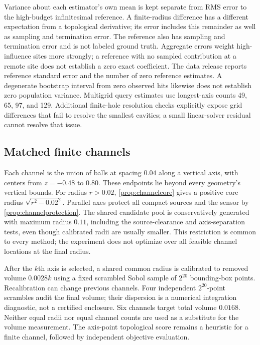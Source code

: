 Variance about each estimator's own mean is kept separate from RMS error to
the high-budget infinitesimal reference. A finite-radius difference has a
different expectation from a topological derivative; its error includes this
remainder as well as sampling and termination error. The reference also has
sampling and termination error and is not labeled ground truth. Aggregate
errors weight high-influence sites more strongly; a reference with no sampled
contribution at a remote site does not establish a zero exact coefficient.
The data release reports reference standard error and the number of zero
reference estimates. A degenerate bootstrap interval from zero observed hits
likewise does not establish zero population variance. Multigrid
query estimates use longest-axis counts 49, 65, 97, and 129. Additional finite-hole
resolution checks explicitly expose grid differences that fail to resolve
the smallest cavities; a small linear-solver residual cannot resolve that issue.

\subsection{Matched finite channels}
Each channel is the union of balls at spacing $0.04$ along a vertical axis,
with centers from $z=-0.48$ to $0.80$. These endpoints lie beyond every
geometry's vertical bounds. For radius $r>0.02$, \cref{prop:channelcore} gives
a positive core radius $\sqrt{r^2-0.02^2}$. Parallel axes protect all compact
sources and the sensor by \cref{prop:channelprotection}. The shared candidate
pool is conservatively generated with maximum radius $0.11$, including the
source-clearance and axis-separation tests, even though calibrated radii are
usually smaller. This restriction is common to every method; the experiment
does not optimize over all feasible channel locations at the final radius.

After the $k$th axis is selected, a shared common radius is calibrated to
removed volume $0.0028k$ using a fixed scrambled Sobol sample of $2^{20}$
bounding-box points. Recalibration can change previous channels. Four independent
$2^{20}$-point scrambles audit the final volume; their dispersion is a numerical
integration diagnostic, not a certified enclosure. Six channels target total
volume $0.0168$. Neither equal radii nor equal channel counts are used as a
substitute for the volume measurement. The axis-point topological score remains
a heuristic for a finite channel, followed by independent objective evaluation.

